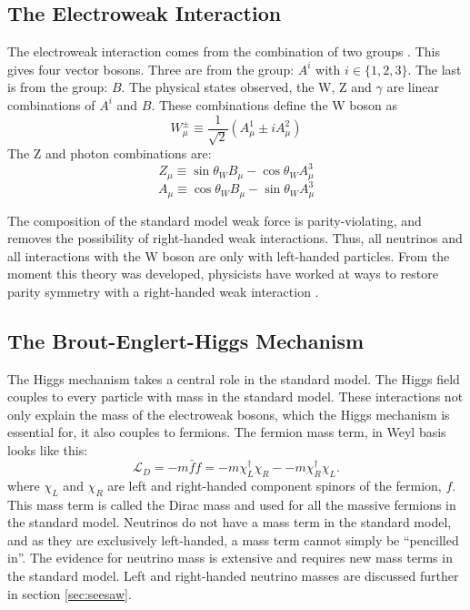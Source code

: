 \subsection{The Electroweak Interaction}
The electroweak interaction comes from the combination of two groups \SUtwoUone . This gives four vector bosons.  Three are from the \SUtwoL group: \ensuremath{A^i} with \ensuremath{i\in\{1,2,3\}}.  The last is from the \Uone group: \ensuremath{B}. The physical states observed, the W, Z and \ensuremath{\gamma} are linear combinations of \ensuremath{A^i} and \ensuremath{B}. These combinations define the W boson as
\begin{equation}\label{eq:Wboson}
    W_{\mu}^{\pm}
    \equiv  
    \frac{1}{\sqrt{2}}
    \left(
    A_{\mu}^{1}
    \pm
    iA_{\mu}^{2}
    \right)
\end{equation}
The Z and photon combinations are:
\begin{equation}\label{eq:Z}
    Z_{\mu}
    \equiv  
    \sin{\theta_W}
    B_{\mu}
    -
    \cos{\theta_W}
    A_\mu^3
    \end{equation}
\begin{equation}\label{eq:photon}
     A_{\mu}
    \equiv  
    \cos{\theta_W}
    B_{\mu}
    -
    \sin{\theta_W}
    A_\mu^3
\end{equation}

The \vminusa composition of the standard model weak force is parity-violating, and removes the possibility of right-handed weak interactions.  Thus, all neutrinos and all interactions with the W boson are only with left-handed particles. From the moment this theory was developed, physicists have worked at ways to restore parity symmetry with a right-handed weak interaction \cite{lr}\cite{lr1}.

\subsection{The Brout-Englert-Higgs Mechanism}
The Higgs mechanism takes a central role in the standard model. The Higgs field couples to every particle with mass in the standard model.  These interactions not only explain the mass of the electroweak bosons, which the Higgs mechanism is essential for, it also couples to fermions. The fermion mass term, in Weyl basis looks like this:
\begin{equation}\label{eq:higgs_fermion_mass}
\mathcal{L}_{D} = -m\bar{f}f = -m \chi _{L}^{\dagger}\chi _{R} - -m \chi _{R}^{\dagger}\chi _{L}.
\end{equation}
where $\chi _{L}$ and $\chi _{R}$ are left and right-handed component spinors of the fermion, $f$. This mass term is called the Dirac mass and used for all the massive fermions in the standard model. Neutrinos do not have a mass term in the standard model, and as they are exclusively left-handed, a mass term cannot simply be ``pencilled in''. The evidence for neutrino mass is extensive \cite{solar_neutrinos_davis}\cite{SNO_neutrinos} and requires new mass terms in the standard model. Left and right-handed neutrino masses are discussed further in section \ref{sec:seesaw}.

